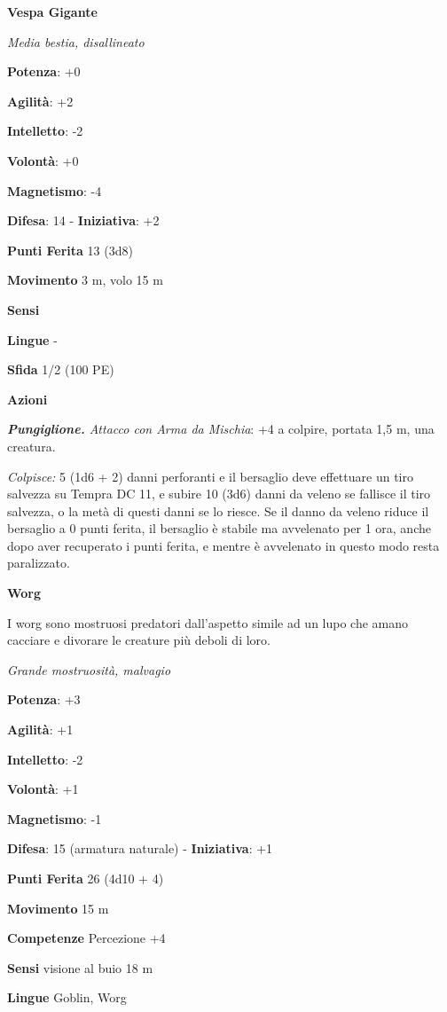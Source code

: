 \begin{multicols}{2}
\textbf{Vespa Gigante}

\emph{Media bestia, disallineato}

\textbf{Potenza}: +0

\textbf{Agilità}: +2

\textbf{Intelletto}: -2

\textbf{Volontà}: +0

\textbf{Magnetismo}: -4

\textbf{Difesa}: 14 - \textbf{Iniziativa}: +2

\textbf{Punti Ferita} 13 (3d8)

\textbf{Movimento} 3 m, volo 15 m

\textbf{Sensi} 

\textbf{Lingue} -

\textbf{Sfida} 1/2 (100 PE)

\textbf{Azioni}

\emph{\textbf{Pungiglione.} Attacco con Arma da Mischia}: +4 a colpire,
portata 1,5 m, una creatura.

\emph{Colpisce:} 5 (1d6 + 2) danni perforanti e il bersaglio deve
effettuare un tiro salvezza su Tempra DC 11, e subire 10 (3d6)
danni da veleno se fallisce il tiro salvezza, o la metà di questi danni
se lo riesce. Se il danno da veleno riduce il bersaglio a 0 punti
ferita, il bersaglio è stabile ma avvelenato per 1 ora, anche dopo aver
recuperato i punti ferita, e mentre è avvelenato in questo modo resta
paralizzato.

\textbf{Worg}

I worg sono mostruosi predatori dall'aspetto simile ad un lupo che amano
cacciare e divorare le creature più deboli di loro.

\emph{Grande mostruosità, malvagio}

\textbf{Potenza}: +3

\textbf{Agilità}: +1

\textbf{Intelletto}: -2

\textbf{Volontà}: +1

\textbf{Magnetismo}: -1

\textbf{Difesa}: 15 (armatura naturale) - \textbf{Iniziativa}: +1

\textbf{Punti Ferita} 26 (4d10 + 4)

\textbf{Movimento} 15 m

\textbf{Competenze} Percezione +4

\textbf{Sensi} visione al buio 18 m

\textbf{Lingue} Goblin, Worg


\end{multicols}

